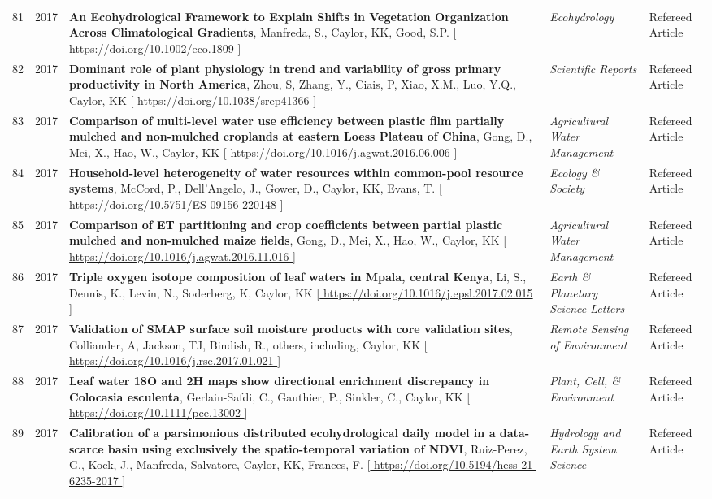 \begin{supertabular}{lcp{8.25cm}p{4.75cm}p{1.75cm}}
81 & 2017 & {\bf An Ecohydrological Framework to Explain Shifts in Vegetation Organization Across Climatological Gradients}, Manfreda, S., Caylor, KK, Good, S.P. [\url{ https://doi.org/10.1002/eco.1809  }] & \emph{ Ecohydrology } & Refereed Article\\
82 & 2017 & {\bf Dominant role of plant physiology in trend and variability of gross primary productivity in North America}, Zhou, S, Zhang, Y., Ciais, P, Xiao, X.M., Luo, Y.Q., Caylor, KK [\url{ https://doi.org/10.1038/srep41366 }] & \emph{ Scientific Reports } & Refereed Article\\
83 & 2017 & {\bf Comparison of multi-level water use efficiency between plastic film partially mulched and non-mulched croplands at eastern Loess Plateau of China}, Gong, D., Mei, X., Hao, W., Caylor, KK [\url{ https://doi.org/10.1016/j.agwat.2016.06.006 }] & \emph{ Agricultural Water Management } & Refereed Article\\
84 & 2017 & {\bf Household-level heterogeneity of water resources within common-pool resource systems}, McCord, P., Dell'Angelo, J., Gower, D., Caylor, KK, Evans, T. [\url{ https://doi.org/10.5751/ES-09156-220148 }] & \emph{ Ecology \& Society } & Refereed Article\\
85 & 2017 & {\bf Comparison of ET partitioning and crop coefficients between partial plastic mulched and non-mulched maize fields}, Gong, D., Mei, X., Hao, W., Caylor, KK [\url{ https://doi.org/10.1016/j.agwat.2016.11.016 }] & \emph{ Agricultural Water Management } & Refereed Article\\
86 & 2017 & {\bf Triple oxygen isotope composition of leaf waters in Mpala, central Kenya}, Li, S., Dennis, K., Levin, N., Soderberg, K, Caylor, KK [\url{ https://doi.org/10.1016/j.epsl.2017.02.015 }] & \emph{ Earth \& Planetary Science Letters } & Refereed Article\\
87 & 2017 & {\bf Validation of SMAP surface soil moisture products with core validation sites}, Colliander, A, Jackson, TJ, Bindish, R., others, including, Caylor, KK [\url{ https://doi.org/10.1016/j.rse.2017.01.021 }] & \emph{ Remote Sensing of Environment } & Refereed Article\\
88 & 2017 & {\bf Leaf water 18O and 2H maps show directional enrichment discrepancy in Colocasia esculenta}, Gerlain-Safdi, C., Gauthier, P., Sinkler, C., Caylor, KK [\url{ https://doi.org/10.1111/pce.13002 }] & \emph{ Plant, Cell, \& Environment } & Refereed Article\\
89 & 2017 & {\bf Calibration of a parsimonious distributed ecohydrological daily model in a data-scarce basin using exclusively the spatio-temporal variation of NDVI}, Ruiz-Perez, G., Kock, J., Manfreda, Salvatore, Caylor, KK, Frances, F. [\url{ https://doi.org/10.5194/hess-21-6235-2017 }] & \emph{ Hydrology and Earth System Science } & Refereed Article\\

\end{supertabular}
